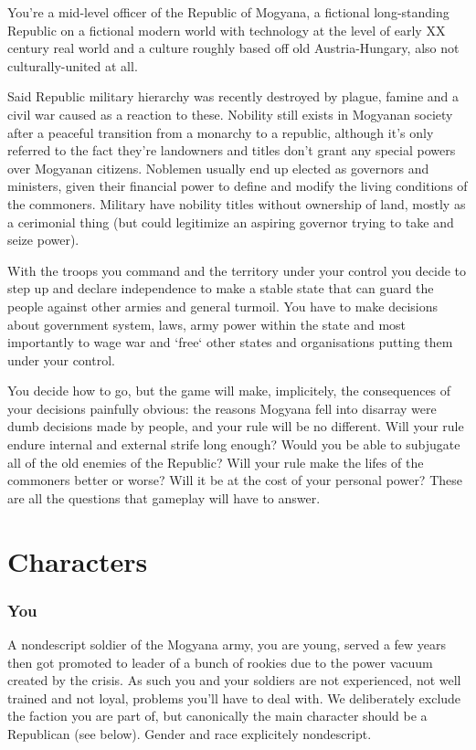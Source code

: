 \documentclass[a4paper, 11pt]{article}
\begin{document}
You're a mid-level officer of the Republic of Mogyana, a fictional long-standing Republic on a fictional modern world with technology at the level of early XX century real world and a culture roughly based off old Austria-Hungary, also not culturally-united at all.


Said Republic military hierarchy was recently destroyed by plague, famine and a civil war caused as a reaction to these. Nobility still exists in Mogyanan society after a peaceful transition from a monarchy to a republic, although it's only referred to the fact they're landowners and titles don't grant any special powers over Mogyanan citizens. Noblemen usually end up elected as governors and ministers, given their financial power to define and modify the living conditions of the commoners. Military have nobility titles without ownership of land, mostly as a cerimonial thing (but could legitimize an aspiring governor trying to take and seize power).

With the troops you command and the territory under your control you decide to step up and declare independence to make a stable state that can guard the people against other armies and general turmoil. You have to make decisions about government system, laws, army power within the state and most importantly to wage war and `free` other states and organisations putting them under your control. 

You decide how to go, but the game will make, implicitely, the consequences of your decisions painfully obvious: the reasons Mogyana fell into disarray were dumb decisions made by people, and your rule will be no different. Will your rule endure internal and external strife long enough? Would you be able to subjugate all of the old enemies of the Republic? Will your rule make the lifes of the commoners better or worse? Will it be at the cost of your personal power? These are all the questions that gameplay will have to answer.

\section*{Characters}

\subsubsection*{You}
A nondescript soldier of the Mogyana army, you are young, served a few years then got promoted to leader of a bunch of rookies due to the power vacuum created by the crisis. As such you and your soldiers are not experienced, not well trained and not loyal, problems you'll have to deal with. We deliberately exclude the faction you are part of, but canonically the main character should be a Republican (see below). Gender and race explicitely nondescript.
\end{document}
